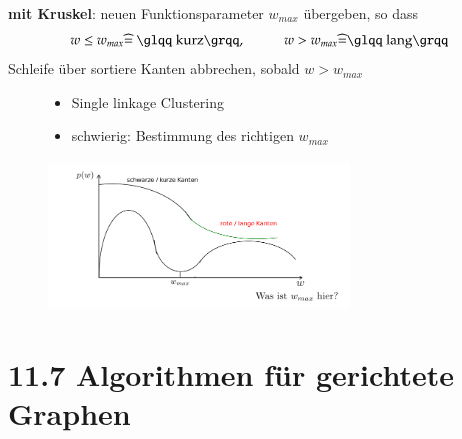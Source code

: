 \documentclass[11pt, fleqn]{scrreprt}
\begin{document}
    \textbf{mit Kruskel}: neuen Funktionsparameter $w_{max}$ übergeben, so dass
    \[w \leq w_{max} \widehat{=}\text{ \glqq kurz\grqq},\hspace*{1cm} w > w_{max} \widehat{=} \text{\glqq lang\grqq} \]
    Schleife über sortiere Kanten abbrechen, sobald $w > w_{max}$
    \begin{figure}[htbp]
        \begin{minipage}{8cm}
            \vspace*{0mm}
            \begin{itemize}
                \item \glqq Single linkage Clustering\grqq
                \item schwierig: Bestimmung des richtigen $w_{max}$
            \end{itemize}
        \end{minipage}
        \begin{minipage}{8cm}
            \vspace*{0mm}
            \includegraphics[width=8cm,height=4cm,keepaspectratio]{./Pictures/wGraph.png}
        \end{minipage}
    \end{figure}


    \section*{11.7 Algorithmen für gerichtete Graphen}
\end{document}
